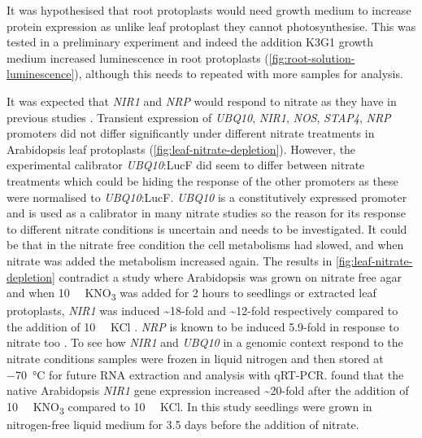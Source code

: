 It was hypothesised that root protoplasts would need growth medium to increase protein expression as unlike leaf protoplast they cannot photosynthesise. This was tested in a preliminary experiment and indeed the addition K3G1 growth medium increased luminescence in root protoplasts (\autoref{fig:root-solution-luminescence}), although this needs to repeated with more samples for analysis.

It was expected that \textit{NIR1} and \textit{NRP} would respond to nitrate as they have in previous studies \autocite{liuDiscoveryNitrateCPKNLPSignalling2017, wangMultipleRegulatoryElements2010}. 
Transient expression of \textit{UBQ10}, \textit{NIR1}, \textit{NOS}, \textit{STAP4}, \textit{NRP} promoters did not differ significantly under different nitrate treatments in Arabidopsis leaf protoplasts
(\autoref{fig:leaf-nitrate-depletion}).
However, the experimental calibrator \textit{UBQ10}:LucF did seem to differ between nitrate treatments which could be hiding the response of the other promoters as these were normalised to \textit{UBQ10}:LucF.
\textit{UBQ10} is a constitutively expressed promoter~\autocite{czechowskiGenomeWideIdentificationTesting2005} and is used as a calibrator in many nitrate studies \autocite{konishiArabidopsisNINlikeTranscription2013a,liuDiscoveryNitrateCPKNLPSignalling2017,satoDirectTranscriptionalActivation2017} so the reason for its response to different nitrate conditions is uncertain and needs to be investigated.
It could be that in the nitrate free condition the cell metabolisms had slowed, and when nitrate was added the metabolism increased again.
The results in \autoref{fig:leaf-nitrate-depletion} contradict a study where Arabidopsis was grown on nitrate free agar and when \SI{10}{\milli\Molar} KNO\textsubscript{3} was added for 2 hours to seedlings or extracted leaf protoplasts, \textit{NIR1} was induced \textasciitilde{}18\hyp{}fold and \textasciitilde{}12\hyp{}fold respectively compared to the addition of \SI{10}{\milli\Molar} KCl \autocite{liuDiscoveryNitrateCPKNLPSignalling2017}.
\textit{NRP} is known to be induced 5.9\hyp{}fold in response to nitrate
too \autocite{wangMultipleRegulatoryElements2010}.
To see how \textit{NIR1} and \textit{UBQ10} in a genomic context respond to the nitrate conditions samples were frozen in liquid nitrogen and then stored at \SI{-70}{\degreeCelsius} for future RNA extraction and analysis with qRT\hyp{}PCR.
\textcite*{konishiIdentificationNitrateresponsiveCiselement2010a} found that the native Arabidopsis \textit{NIR1} gene expression increased \textasciitilde{}20\hyp{}fold after the addition of \SI{10}{\milli\Molar} KNO\textsubscript{3} compared to \SI{10}{\milli\Molar} KCl.
In this study seedlings were grown in nitrogen\hyp{}free liquid medium for 3.5 days before the addition of nitrate.

